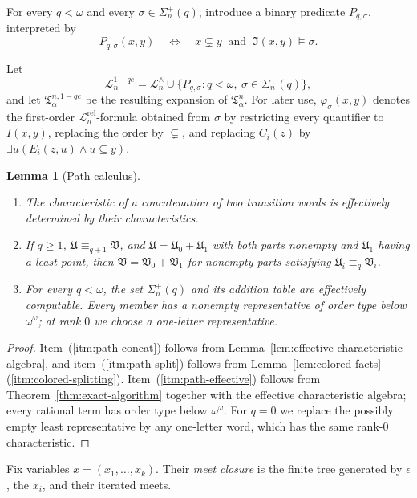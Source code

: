 \documentclass{amsart}
\newtheorem{lemma}{Lemma}
\theoremstyle{definition}
\begin{document}
For every $q<\omega$ and every $\sigma\in\Sigma_n^{+}(q)$, introduce a binary predicate $P_{q,\sigma}$, interpreted by
$$P_{q,\sigma}(x,y)\quad\Longleftrightarrow\quad x\subsetneq y\ \text{ and }\ \mathfrak I(x,y)\models\sigma.$$

Let
$$\mathcal L_n^{1-qe}=\mathcal L_n^\wedge\cup\{P_{q,\sigma}:q<\omega,\ \sigma\in\Sigma_n^{+}(q)\},$$
and let $\mathfrak T^{n,1-qe}_\alpha$ be the resulting expansion of $\mathfrak T_\alpha^n$. For later use, $\varphi_\sigma(x,y)$ denotes the first-order $\mathcal L_n^{\mathrm{rel}}$-formula obtained from $\sigma$ by restricting every quantifier to $I(x,y)$, replacing the order by $\subsetneq$, and replacing $C_i(z)$ by $\exists u(E_i(z,u)\wedge u\subseteq y)$.

\begin{lemma}[Path calculus]\label{lem:path-calculus}
    \begin{enumerate}
        \item\label{itm:path-concat} The characteristic of a concatenation of two transition words is effectively determined by their characteristics.
        \item\label{itm:path-split} If $q\geq1$, $\mathfrak U\equiv_{q+1}\mathfrak V$, and $\mathfrak U=\mathfrak U_0+\mathfrak U_1$ with both parts nonempty and $\mathfrak U_1$ having a least point, then $\mathfrak V=\mathfrak V_0+\mathfrak V_1$ for nonempty parts satisfying $\mathfrak U_i\equiv_q\mathfrak V_i$.
        \item\label{itm:path-effective} For every $q<\omega$, the set $\Sigma_n^{+}(q)$ and its addition table are effectively computable. Every member has a nonempty representative of order type below $\omega^\omega$; at rank $0$ we choose a one-letter representative.
    \end{enumerate}
\end{lemma}
\begin{proof}
    Item~(\ref{itm:path-concat}) follows from Lemma~\ref{lem:effective-characteristic-algebra}, and item~(\ref{itm:path-split}) follows from Lemma~\ref{lem:colored-facts}(\ref{itm:colored-splitting}). Item~(\ref{itm:path-effective}) follows from Theorem~\ref{thm:exact-algorithm} together with the effective characteristic algebra; every rational term has order type below $\omega^\omega$. For $q=0$ we replace the possibly empty least representative by any one-letter word, which has the same rank-$0$ characteristic.
\end{proof}

Fix variables $\bar x=(x_1,\ldots,x_k)$. Their \emph{meet closure} is the finite tree generated by $\epsilon$, the $x_i$, and their iterated meets.
\end{document}
